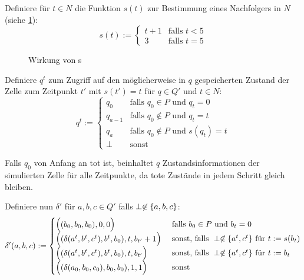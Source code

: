 \begin{definition}
    Definiere für $t \in N$ die Funktion $s(t)$ zur Bestimmung eines Nachfolgers in $N$ (siehe \cref{wirkungVonS}):
    \[
        s(t) :=
        \begin{cases}
            t + 1 & \text{falls } t < 5 \\
            3 & \text{falls } t = 5
        \end{cases}
    \]
    
    \begin{figure}[h]
        \centering
        
        \caption{Wirkung von s}
        \label{wirkungVonS}
    \end{figure}
    
    
    Definiere $q^t$ zum Zugriff auf den möglicherweise in $q$ gespeicherten Zustand der Zelle zum Zeitpunkt $t'$ mit $s(t') = t$
    für $q \in Q'$ und $t \in N$:
    \[
        q^{t} :=
        \begin{cases}
            q_{0} & \text{falls } q_0 \in P \text{ und } q_t = 0 \\
            q_{a-1} & \text{falls } q_0 \not\in P \text{ und } q_t = t \\
            q_a & \text{falls } q_0 \not\in P \text{ und } s(q_t) = t \\
            \perp & \text{sonst}
        \end{cases}
    \]
    
    Falls $q_0$ von Anfang an tot ist,
    beinhaltet $q$ Zustandsinformationen
    der simulierten Zelle für alle Zeitpunkte,
    da tote Zustände in jedem Schritt gleich bleiben.
    
    Definiere nun $\delta'$ für $a, b, c \in Q'$ falls $\perp \not\in \{ { a, b, c} \}$:
    \[
        \delta'(a, b, c) := 
        \begin{cases}
            \Spvek{(b_0, b_0, b_0), 0, 0}
            & \text{ falls } b_0 \in P \text{ und } b_t = 0 \\
            \Spvek{(\delta(a^t, b^t, c^t), b^t, b_0), t, b_{t'} + 1}
            & \text{ sonst, falls } \perp \not\in \finset{ a^t, c^t } \text{ für } t := s(b_t) \\
            \Spvek{(\delta(a^t, b^t, c^t), b^t, b_0), t, b_{t'}}
            & \text{ sonst, falls } \perp \not\in \finset{a^t, c^t} \text{ für } t := b_t \\
            \Spvek{(\delta(a_0, b_0, c_0), b_0, b_0), 1, 1}
            & \text{ sonst}
        \end{cases}
    \]
    

\end{definition}
